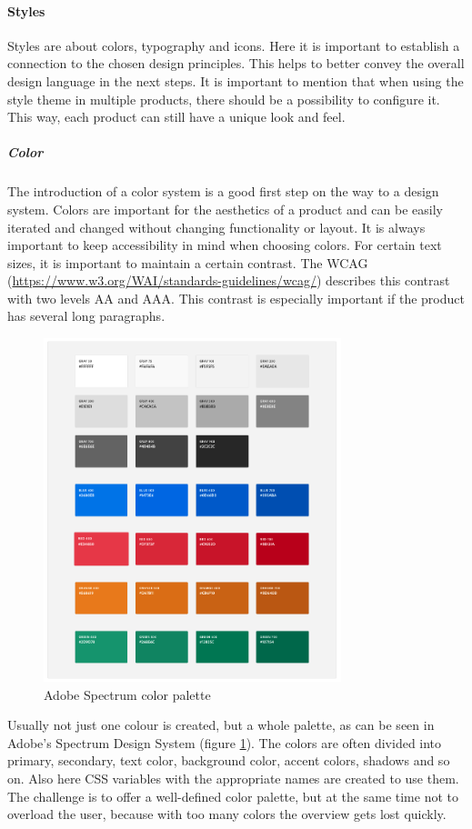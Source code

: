 \paragraph{Styles}
Styles are about colors, typography and icons. Here it is important to establish a connection to the chosen design principles. This helps to better convey the overall design language in the next steps. 
It is important to mention that when using the style theme in multiple products, there should be a possibility to configure it. This way, each product can still have a unique look and feel. \cite{vesselov_building_2019}
\subparagraph{Color}
The introduction of a color system is a good first step on the way to a design system. Colors are important for the aesthetics of a product and can be easily iterated and changed without changing functionality or layout. It is always important to keep accessibility in mind when choosing colors. For certain text sizes, it is important to maintain a certain contrast. The WCAG (\url{https://www.w3.org/WAI/standards-guidelines/wcag/}) describes this contrast with two levels AA and AAA. This contrast is especially important if the product has several long paragraphs.  \\
\begin{figure}[hbtp]
	\centerline{\includegraphics[height=10cm]{images/adobe_spectrum_color_palette.png}}
	\caption{Adobe Spectrum color palette \cite{spectrum_adobe_spectrum_nodate}}
	\label{adobe_spectrum_colors}
\end{figure}

Usually not just one colour is created, but a whole palette, as can be seen in Adobe's Spectrum Design System (figure \ref{adobe_spectrum_colors}). The colors are often divided into primary, secondary, text color, background color, accent colors, shadows and so on. Also here CSS variables with the appropriate names are created to use them. The challenge is to offer a well-defined color palette, but at the same time not to overload the user, because with too many colors the overview gets lost quickly. \cite{vesselov_building_2019}

